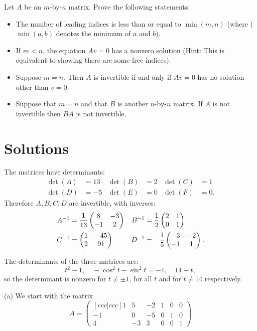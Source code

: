 \documentclass{article}
\begin{document}
\begin{Exercise}
Let \(A\) be an \(m\)-by-\(n\) matrix. Prove the following
statements:
\begin{itemize}
\item The number of leading indices is less than or equal to
\(\min(m,n)\) (where (\(\min(a,b)\) denotes the minimum of \(a\)
and \(b\)).
\item If \(m<n\), the equation \(Av=0\) has a nonzero solution (Hint:
This is equivalent to showing there are some free indices).
\item Suppose \(m=n\). Then \(A\) is invertible if and only if \(Av=0\)
has no solution other than \(v=0\).
\item Suppose that \(m=n\) and that \(B\) is another \(n\)-by-\(n\)
matrix. If \(A\) is not invertible then \(BA\) is not invertible.


\end{itemize}
\end{Exercise}
\newpage


\section{Solutions}


\begin{Solution}
The matrices have determinants:
\begin{align*}
\det(A)&=13& \det(B)&=2& \det(C)&=1\\
\det(D)&=-5& \det(E)&=0& \det(F)&=0.
\end{align*}
Therefore \(A,B,C,D\) are invertible, with inverses:
\begin{align*}
A^{-1}&=\frac{1}{13}\begin{pmatrix} 8 & -3 \\ -1 & 2\end{pmatrix} & B^{-1}&=\frac{1}{2}\begin{pmatrix} 2 & 1 \\ 0 & 1\end{pmatrix}\\
C^{-1}&=\begin{pmatrix} 1 & -45 \\ 2 & 91\end{pmatrix}& D^{-1}&=-\frac{1}{5}\begin{pmatrix} -3 & -2 \\ -1 & 1\end{pmatrix}.
\end{align*}


\end{Solution}
\begin{Solution}
The determinants of the three matrices are:
\[t^2-1,\quad -\cos^2 t-\sin^2t=-1,\quad 14-t,\]
so the determinant is nonzero for \(t\neq \pm 1\), for all \(t\) and
for \(t\neq 14\) respectively.


\end{Solution}
\begin{Solution}


\end{Solution}
(a) We start with the matrix \[A=\begin{pmatrix}[ c c c | c c c ] 1 &
5 & -2 & 1 & 0 & 0 \\ -1 & 0 & -5 & 0 & 1 & 0 \\ 4 & -3 & 3 & 0 & 0 &
1 \end{pmatrix}\]
\end{document}
